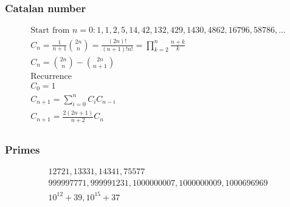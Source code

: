 \subsubsection{Catalan number}

\begin{gather*}
    \text{Start from } n = 0: 1, 1, 2, 5, 14, 42, 132, 429, 1430, 4862, 16796, 58786, ... \\
    C_n = \frac{1}{n + 1} \binom{2n}{n} = \frac{(2n)!}{(n + 1)! n!} = \prod_{k = 2}^n \frac{n + k}{k} \\
    C_n = \binom{2n}{n} - \binom{2n}{n + 1} \\
    \text{Recurrence} \\
    C_0 = 1 \\
    C_{n + 1} = \sum_{i = 0}^n C_i C_{n - i} \\
    C_{n + 1} = \frac{2(2n + 1)}{n + 2} C_n \\
\end{gather*}

\subsubsection{Primes}
\begin{gather*}
    12721, 13331, 14341, 75577 \\
    999997771, 999991231, 1000000007, 1000000009, 1000696969 \\
    10^{12} + 39, 10^{15} + 37
\end{gather*}
